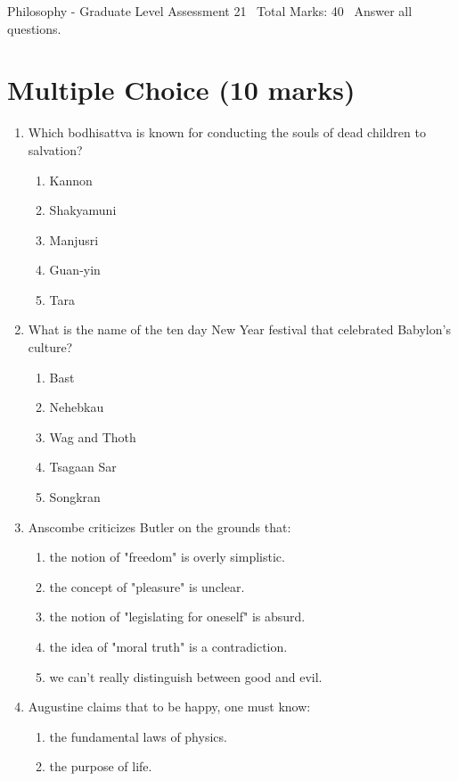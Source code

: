 \documentclass[12pt]{article}
\begin{document}
\begin{center}
Philosophy - Graduate Level Assessment 21 \
Total Marks: 40 \
Answer all questions.
\end{center}

\section*{Multiple Choice (10 marks)}
\begin{enumerate}[label=\arabic*.]
\item Which bodhisattva is known for conducting the souls of dead children to salvation?
\begin{enumerate}[label=(\alph*)]
    \item Kannon
    \item Shakyamuni
    \item Manjusri
    \item Guan-yin
    \item Tara
\end{enumerate}
\item What is the name of the ten day New Year festival that celebrated Babylon's culture?
\begin{enumerate}[label=(\alph*)]
    \item Bast
    \item Nehebkau
    \item Wag and Thoth
    \item Tsagaan Sar
    \item Songkran
\end{enumerate}
\item Anscombe criticizes Butler on the grounds that:
\begin{enumerate}[label=(\alph*)]
    \item the notion of "freedom" is overly simplistic.
    \item the concept of "pleasure" is unclear.
    \item the notion of "legislating for oneself" is absurd.
    \item the idea of "moral truth" is a contradiction.
    \item we can't really distinguish between good and evil.
\end{enumerate}
\item Augustine claims that to be happy, one must know:
\begin{enumerate}[label=(\alph*)]
    \item the fundamental laws of physics.
    \item the purpose of life.

\end{enumerate}
\end{enumerate}
\end{document}
